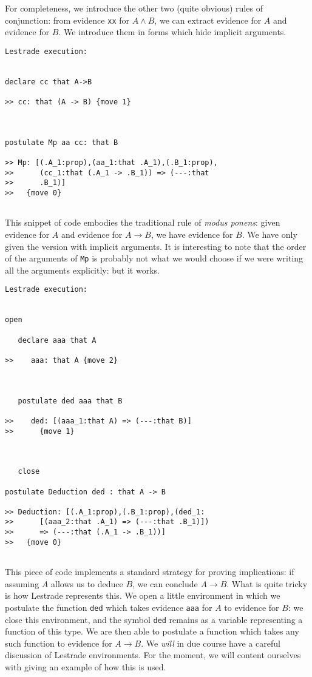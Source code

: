 \documentclass[12pt]{article}
\begin{document}
For completeness, we introduce the other two (quite obvious) rules of conjunction:  from evidence {\tt xx} for $A \wedge B$, we can extract evidence for $A$ and evidence for $B$.  We introduce them in forms which hide implicit arguments.

\begin{verbatim}Lestrade execution:


declare cc that A->B

>> cc: that (A -> B) {move 1}



postulate Mp aa cc: that B

>> Mp: [(.A_1:prop),(aa_1:that .A_1),(.B_1:prop),
>>      (cc_1:that (.A_1 -> .B_1)) => (---:that
>>      .B_1)]
>>   {move 0}


\end{verbatim}

This snippet of code embodies the traditional rule of {\em modus ponens}:  given evidence for $A$ and evidence for $A \rightarrow B$, we have evidence for $B$.  We have only given the version with implicit arguments.  It is interesting to note that the order of the arguments of {\tt Mp} is probably not what we would choose if we were writing all the arguments explicitly:  but it works.

\begin{verbatim}Lestrade execution:


open

   declare aaa that A

>>    aaa: that A {move 2}



   postulate ded aaa that B

>>    ded: [(aaa_1:that A) => (---:that B)]
>>      {move 1}



   close

postulate Deduction ded : that A -> B

>> Deduction: [(.A_1:prop),(.B_1:prop),(ded_1:
>>      [(aaa_2:that .A_1) => (---:that .B_1)])
>>      => (---:that (.A_1 -> .B_1))]
>>   {move 0}


\end{verbatim}

This piece of code implements a standard strategy for proving implications:  if assuming $A$ allows us to deduce $B$, we can conclude $A \rightarrow B$.  What is quite tricky is how Lestrade represents this.  We open a little environment in which we postulate the function {\tt ded} which takes 
evidence {\tt aaa} for $A$ to evidence for $B$:  we close this environment, and the symbol {\tt ded} remains as a variable representing a function of this type.  We are then able to postulate a function which takes any such function to evidence for $A \rightarrow B$.  We {\em will\/} in due course have a careful discussion of Lestrade environments.  For the moment, we will content ourselves with giving an example of how this is used.
\end{document}
